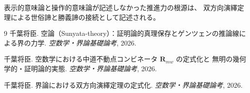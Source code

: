 \documentclass[11pt,a4paper]{ltjsarticle}
\theoremstyle{definition}
\begin{document}
表示的意味論と操作的意味論が記述しなかった推進力の根源は、
双方向演繹定理による世俗諦と勝義諦の接続として記述される。

\begin{thebibliography}{9}
千葉将臣.
\newblock 空論（Sunyata-theory）：証明論的真理保存とゲンツェンの推論線による界の力学.
\newblock \emph{空数学・界論基礎論考}, 2026.

千葉将臣.
\newblock 空数学における中道不動点コンビネータ $\mathbf{R}_{mw}$ の定式化と
無明の幾何学的・証明論的実態.
\newblock \emph{空数学・界論基礎論考}, 2026.

千葉将臣.
\newblock 界論における双方向演繹定理の定式化.
\newblock \emph{空数学・界論基礎論考}, 2026.
\end{thebibliography}
\end{document}
